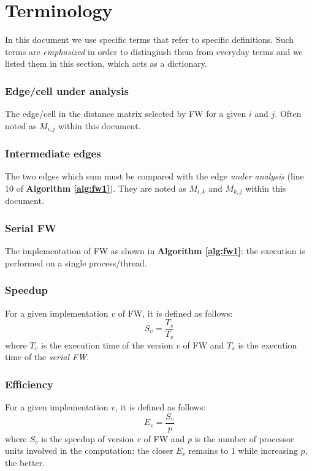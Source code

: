\section{Terminology}
In this document we use specific terms that refer to specific definitions. Such terms are \emph{emphasized} in order to distingiush them from everyday terms
and we listed them in this section, which acts as a dictionary.

\subsubsection*{Edge/cell under analysis} 
The edge/cell in the distance matrix selected by FW for a given $i$ and $j$. Often noted as $M_{i,j}$ within this document.

\subsubsection*{Intermediate edges} 
The two edges which sum must be compared with the edge \emph{under analysis} (line 10 of \textbf{Algorithm \ref*{alg:fw1}}).
They are noted as $M_{i,k}$ and $M_{k,j}$ within this document.

\subsubsection*{Serial FW} 
The implementation of FW as shown in \textbf{Algorithm \ref*{alg:fw1}}: the execution is performed on a single process/thread.

\subsubsection*{Speedup}
For a given implementation $v$ of FW, it is defined as follows:
\[S_{v} = \frac{T_{s}}{T_{v}}\]
where $T_v$ is the execution time of the version $v$ of FW and $T_s$ is the execution time of the \emph{serial FW}. 

\subsubsection*{Efficiency}
For a given implementation $v$, it is defined as follows:
\[E_v = \frac{S_v}{p}\]
where $S_v$ is the speedup of version $v$ of FW and $p$ is the number of processor units involved in the computation; the closer $E_v$ remains to $1$ while increasing $p$, the better.